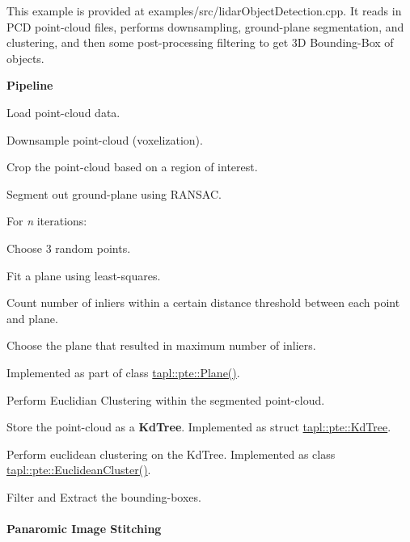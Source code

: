 This example is provided at {\ttfamily examples/src/lidar\+Object\+Detection.\+cpp}. It reads in P\+CD point-\/cloud files, performs downsampling, ground-\/plane segmentation, and clustering, and then some post-\/processing filtering to get 3D Bounding-\/\+Box of objects.

{\bfseries Pipeline}


\begin{DoxyItemize}
\item Load point-\/cloud data.
\item Downsample point-\/cloud (voxelization).
\item Crop the point-\/cloud based on a region of interest.
\item Segment out ground-\/plane using R\+A\+N\+S\+AC.
\begin{DoxyItemize}
\item For {\itshape n} iterations\+:
\begin{DoxyItemize}
\item Choose 3 random points.
\item Fit a plane using least-\/squares.
\item Count number of inliers within a certain distance threshold between each point and plane.
\end{DoxyItemize}
\item Choose the plane that resulted in maximum number of inliers.
\item Implemented as part of {\ttfamily class \hyperlink{classtapl_1_1pte_1_1Plane}{tapl\+::pte\+::\+Plane()}}.
\end{DoxyItemize}
\item Perform Euclidian Clustering within the segmented point-\/cloud.
\begin{DoxyItemize}
\item Store the point-\/cloud as a {\bfseries Kd\+Tree}. Implemented as {\ttfamily struct \hyperlink{structtapl_1_1pte_1_1KdTree}{tapl\+::pte\+::\+Kd\+Tree}}.
\item Perform euclidean clustering on the Kd\+Tree. Implemented as {\ttfamily class \hyperlink{classtapl_1_1pte_1_1EuclideanCluster}{tapl\+::pte\+::\+Euclidean\+Cluster()}}.
\end{DoxyItemize}
\item Filter and Extract the bounding-\/boxes.
\end{DoxyItemize}





\paragraph*{Panaromic Image Stitching}

